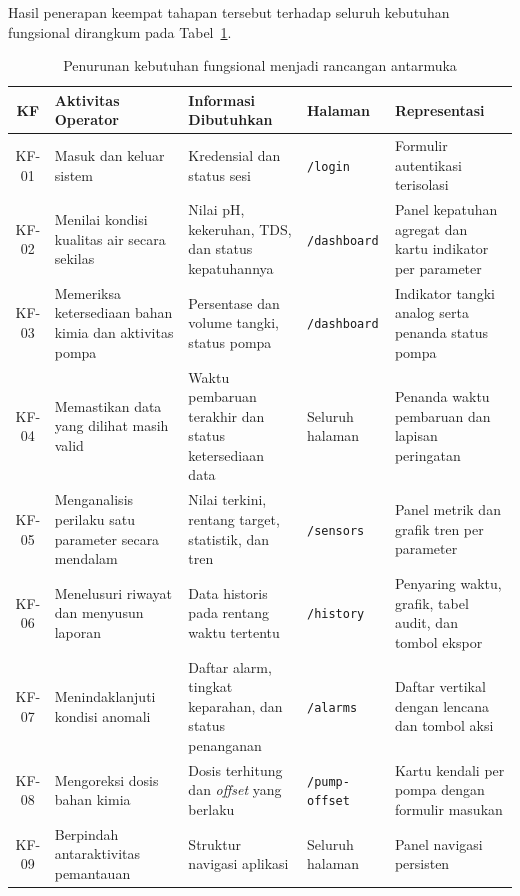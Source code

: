Hasil penerapan keempat tahapan tersebut terhadap seluruh kebutuhan fungsional dirangkum pada 
Tabel~\ref{tab:penurunan-kf}.

\begin{table}[H]
\centering
\caption{Penurunan kebutuhan fungsional menjadi rancangan antarmuka}
\label{tab:penurunan-kf}
\renewcommand{\arraystretch}{1.25}
\small
\begin{tabular}{|c|p{3.2cm}|p{3.7cm}|p{2cm}|p{3.7cm}|}
\hline
\textbf{KF} & \textbf{Aktivitas Operator} & \textbf{Informasi Dibutuhkan} & \textbf{Halaman} & \textbf{Representasi} \\ \hline
KF-01 & Masuk dan keluar sistem & Kredensial dan status sesi & \texttt{/login} & Formulir autentikasi terisolasi \\ \hline
KF-02 & Menilai kondisi kualitas air secara sekilas & Nilai pH, kekeruhan, TDS, dan status kepatuhannya & \texttt{/dashboard} & Panel kepatuhan agregat dan kartu indikator per parameter \\ \hline
KF-03 & Memeriksa ketersediaan bahan kimia dan aktivitas pompa & Persentase dan volume tangki, status pompa & \texttt{/dashboard} & Indikator tangki analog serta penanda status pompa \\ \hline
KF-04 & Memastikan data yang dilihat masih valid & Waktu pembaruan terakhir dan status ketersediaan data & Seluruh halaman & Penanda waktu pembaruan dan lapisan peringatan \\ \hline
KF-05 & Menganalisis perilaku satu parameter secara mendalam & Nilai terkini, rentang target, statistik, dan tren & \texttt{/sensors} & Panel metrik dan grafik tren per parameter \\ \hline
KF-06 & Menelusuri riwayat dan menyusun laporan & Data historis pada rentang waktu tertentu & \texttt{/history} & Penyaring waktu, grafik, tabel audit, dan tombol ekspor \\ \hline
KF-07 & Menindaklanjuti kondisi anomali & Daftar alarm, tingkat keparahan, dan status penanganan & \texttt{/alarms} & Daftar vertikal dengan lencana dan tombol aksi \\ \hline
KF-08 & Mengoreksi dosis bahan kimia & Dosis terhitung dan \textit{offset} yang berlaku & \texttt{/pump-offset} & Kartu kendali per pompa dengan formulir masukan \\ \hline
KF-09 & Berpindah antaraktivitas pemantauan & Struktur navigasi aplikasi & Seluruh halaman & Panel navigasi persisten \\ \hline
\end{tabular}
\end{table}

